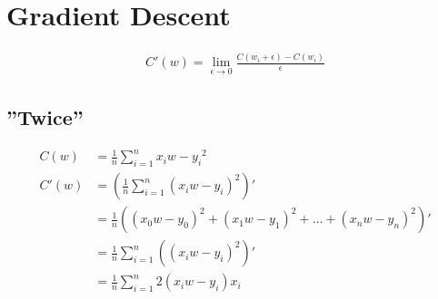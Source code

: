 \documentclass{article}
\begin{document}
\section{Gradient Descent}

\begin{align}
    C'(w) = \lim_{\epsilon \to 0} \frac{C(w_i + \epsilon) - C(w_i)}{\epsilon}
\end{align}

\subsection{''Twice''}
\begin{align}
    C(w) &= \frac{1}{n}\sum_{i=1}^{n}{x_i w - y_i}^2 \\
    C'(w) &= \left(\frac{1}{n}\sum_{i=1}^{n}{(x_i w - y_i)}^2\right)' \\
            &= \frac{1}{n}\left({(x_0w - y_0)}^2 + {(x_1w - y_1)}^2 + \hdots + {(x_n w - y_n)}^2\right)' \\
            &= \frac{1}{n}\sum_{i=1}^{n}\left({(x_i w - y_i)}^2\right)' \\
            &= \frac{1}{n}\sum_{i=1}^{n}2(x_i w - y_i)x_i \\
 \end{align}
\end{document}
